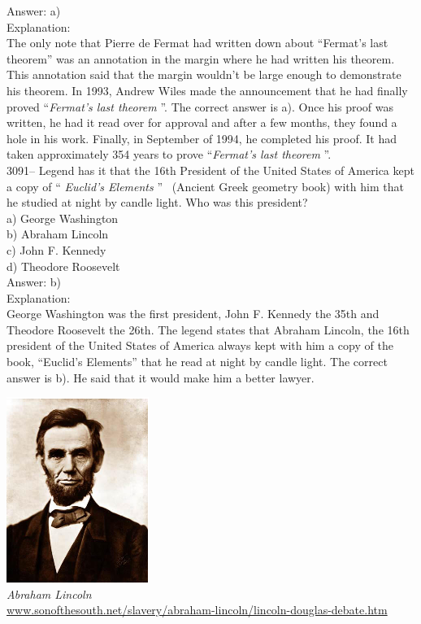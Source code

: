 \documentclass[letterpaper, 12pt]{article}
\begin{document}
Answer: a)\\

Explanation:\\
The only note that Pierre de Fermat had written down about ``Fermat's last theorem'' was an annotation in the margin where he had written his theorem.  This annotation said that the margin wouldn't be large enough to demonstrate his theorem.  In 1993, Andrew Wiles made the announcement that he had finally proved ``\emph{Fermat's last theorem} ''.  The correct answer is a).  Once his proof was written, he had it read over for approval and after a few months, they found a hole in his work. Finally, in September of 1994, he completed his proof. It had taken approximately 354 years to prove ``\emph{Fermat's last theorem} ''.\\



3091-- Legend has it that the 16th President of the United States of America kept a copy of `` \emph{Euclid's Elements} '' \ (Ancient Greek geometry book) with him that he studied at night by candle light. Who was this president?\\

a) George Washington\\
b) Abraham Lincoln\\
c) John F. Kennedy\\
d) Theodore Roosevelt\\

Answer: b)\\

Explanation:\\
George Washington was the first president, John F. Kennedy the 35th and Theodore Roosevelt the 26th. The legend states that Abraham Lincoln, the 16th president of the United States of America always kept with him a copy of the book, ``Euclid's Elements'' that he read at night by candle light.  The correct answer is b).  He said that it would make him a better lawyer.
\begin{center}
\includegraphics[]{Lincoln.eps}\\
\emph{{\small Abraham Lincoln}}\\
\href{http://www.sonofthesouth.net/slavery/abraham-lincoln/lincoln-douglas-debate.htm}{www.sonofthesouth.net/slavery/abraham-lincoln/lincoln-douglas-debate.htm}\\[5mm]
\end{center}
\end{document}
